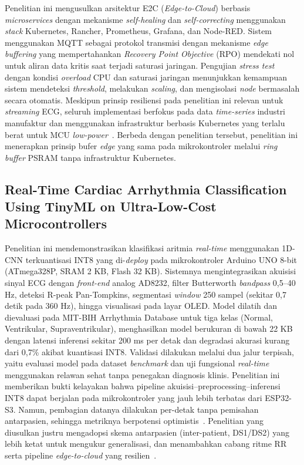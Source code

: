 Penelitian ini mengusulkan arsitektur E2C (\textit{Edge-to-Cloud}) berbasis \textit{microservices} dengan mekanisme \textit{self-healing} dan \textit{self-correcting} menggunakan \textit{stack} Kubernetes, Rancher, Prometheus, Grafana, dan Node-RED. Sistem menggunakan MQTT sebagai protokol transmisi dengan mekanisme \textit{edge buffering} yang mempertahankan \textit{Recovery Point Objective} (RPO) mendekati nol untuk aliran data kritis saat terjadi saturasi jaringan. Pengujian \textit{stress test} dengan kondisi \textit{overload} CPU dan saturasi jaringan menunjukkan kemampuan sistem mendeteksi \textit{threshold}, melakukan \textit{scaling}, dan mengisolasi \textit{node} bermasalah secara otomatis. Meskipun prinsip resiliensi pada penelitian ini relevan untuk \textit{streaming} ECG, seluruh implementasi berfokus pada data \textit{time-series} industri manufaktur dan menggunakan infrastruktur berbasis Kubernetes yang terlalu berat untuk MCU \textit{low-power}~\cite{resilient_edge_cloud}. Berbeda dengan penelitian tersebut, penelitian ini menerapkan prinsip bufer \textit{edge} yang sama pada mikrokontroler melalui \textit{ring buffer} PSRAM tanpa infrastruktur Kubernetes.

\subsection{Real-Time Cardiac Arrhythmia Classification Using TinyML on
Ultra-Low-Cost Microcontrollers}
\label{subsec:related-zambrano2026}

Penelitian ini mendemonstrasikan klasifikasi aritmia \emph{real-time} menggunakan
1D-CNN terkuantisasi INT8 yang di-\emph{deploy} pada mikrokontroler Arduino UNO 8-bit
(ATmega328P, SRAM 2 KB, Flash 32 KB). Sistemnya mengintegrasikan akuisisi sinyal ECG
dengan \emph{front-end} analog AD8232, filter Butterworth \emph{bandpass} 0,5--40 Hz,
deteksi R-peak Pan-Tompkins, segmentasi \emph{window} 250 sampel (sekitar 0,7 detik
pada 360 Hz), hingga visualisasi pada layar OLED. Model dilatih dan dievaluasi pada
MIT-BIH Arrhythmia Database untuk tiga kelas (Normal, Ventrikular, Supraventrikular),
menghasilkan model berukuran di bawah 22 KB dengan latensi inferensi sekitar 200 ms
per detak dan degradasi akurasi kurang dari 0,7\% akibat kuantisasi INT8. Validasi
dilakukan melalui dua jalur terpisah, yaitu evaluasi model pada dataset \emph{benchmark}
dan uji fungsional \emph{real-time} menggunakan relawan sehat tanpa penegakan diagnosis
klinis. Penelitian ini memberikan bukti kelayakan bahwa pipeline
akuisisi--preprocessing--inferensi INT8 dapat berjalan pada mikrokontroler yang
jauh lebih terbatas dari ESP32-S3. Namun, pembagian datanya dilakukan per-detak tanpa
pemisahan antarpasien, sehingga metriknya berpotensi optimistis~\cite{luz_2016}. Penelitian yang
diusulkan justru mengadopsi skema antarpasien (inter-patient, DS1/DS2) yang lebih ketat
untuk mengukur generalisasi, dan menambahkan cabang ritme RR serta pipeline
\textit{edge-to-cloud} yang resilien~\cite{zambrano_2026}.


